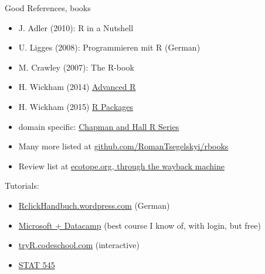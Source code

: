 \documentclass[xcolor=table,       handout,    xcolor=dvipsnames]{beamer}\usepackage[]{graphicx}\usepackage[]{color}
\newcommand{\datalink}[1]{\href{https://raw.githubusercontent.com/brry/course/master/data/#1}{#1}}
\begin{document}


\begin{frame}[fragile]{Good References, books }%
\begin{itemize}[<+->]
\item J. Adler (2010): R in a Nutshell
\item U. Ligges (2008): Programmieren mit R (German)
\item M. Crawley (2007): The R-book
\item H. Wickham (2014) \href{http://adv-r.had.co.nz}{Advanced R}
\item H. Wickham (2015) \href{http://r-pkgs.had.co.nz}{R Packages}
\item domain specific: \href{http://www.crcpress.com/browse/series/crctherser}{Chapman and Hall R Series}
\item Many more listed at \href{https://github.com/RomanTsegelskyi/rbooks}{github.com/RomanTsegelskyi/rbooks}
\item Review list at \href{https://web.archive.org/web/20130619094650/http://ecotope.org/blogs/page/R-Book-Review.aspx}{ecotope.org, through the wayback machine}
\end{itemize}
\onslide<+-> Tutorials:
\begin{itemize}[<+->]
\item \href{http://RclickHandbuch.wordpress.com}{RclickHandbuch.wordpress.com} (German)
\item \href{https://www.edx.org/course/introduction-r-programming-microsoft-dat204x-0#!}{Microsoft + Datacamp} (best course I know of, with login, but free)
\item \href{http://tryr.codeschool.com/levels/1/challenges/1}{tryR.codeschool.com} (interactive)
\item \href{http://stat545-ubc.github.io/topics.html}{STAT 545}
\end{itemize}
\label{books}
\end{frame}
\end{document}
